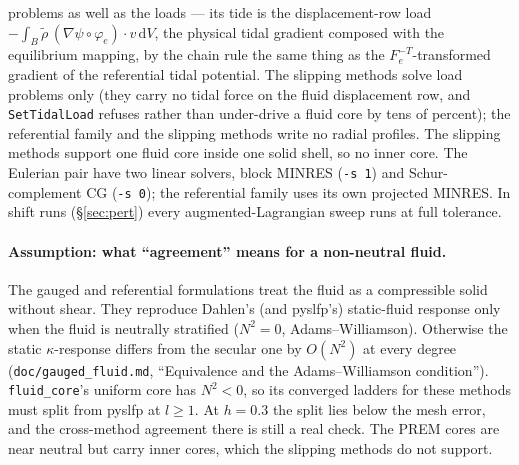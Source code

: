 \documentclass[11pt]{article}
\numberwithin{equation}{section}
\newcommand{\dV}{\,\mathrm{d}V}
\newcommand{\code}[1]{\texttt{#1}}
\begin{document}
problems as well as the loads --- its tide is the displacement-row load
$-\int_B\tilde\rho\,(\nabla\psi\circ\varphi_e)\cdot v\dV$, the
physical tidal gradient composed with the equilibrium mapping, by the
chain rule the same thing as the $F_e^{-T}$-transformed gradient of
the referential tidal potential. The slipping methods solve load
problems only (they carry no tidal force on the fluid displacement
row, and \code{SetTidalLoad} refuses rather than under-drive a fluid
core by tens of percent); the referential family and the slipping
methods write no radial profiles. The slipping methods support one fluid core inside one solid
shell, so no inner core. The Eulerian pair have two linear solvers, block
MINRES (\code{-s 1}) and Schur-complement CG (\code{-s 0}); the referential
family uses its own projected MINRES. In shift runs
(\S\ref{sec:pert}) every augmented-Lagrangian sweep runs at full
tolerance.

\paragraph{Assumption: what ``agreement'' means for a non-neutral fluid.}
The gauged and referential formulations treat the fluid as a compressible
solid without shear. They reproduce Dahlen's (and pyslfp's) static-fluid
response only when the fluid is neutrally stratified ($N^2=0$,
Adams--Williamson). Otherwise the static $\kappa$-response differs from
the secular one by $O(N^2)$ at every degree (\code{doc/gauged\_fluid.md},
``Equivalence and the Adams--Williamson condition''). \code{fluid\_core}'s
uniform core has $N^2<0$, so its converged ladders for these methods must
split from pyslfp at $l\ge 1$. At $h=0.3$ the split lies below the mesh
error, and the cross-method agreement there is still a real check. The
PREM cores are near neutral but carry inner cores, which the slipping
methods do not support.
\end{document}
